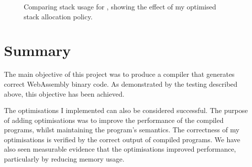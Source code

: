 \documentclass[00-main.tex]{subfiles}
\begin{document}
\begin{figure}[p]
  \centering
  \caption{Comparing stack usage for , showing the effect of my optimised stack allocation policy.}
  \label{fig:comparing stack usage for fibonacci.c} %
\end{figure}



\section{Summary}

The main objective of this project was to produce a compiler that generates correct WebAssembly binary code.
As demonstrated by the testing described above, this objective has been achieved.

The optimisations I implemented can also be considered successful.
The purpose of adding optimisations was to improve the performance of the compiled programs, whilst maintaining the program's semantics.
The correctness of my optimisations is verified by the correct output of compiled programs.
We have also seen measurable evidence that the optimisations improved performance, particularly by reducing memory usage.
\end{document}
